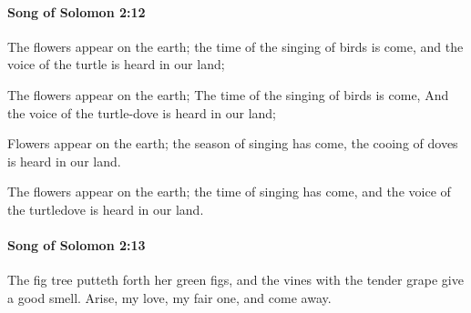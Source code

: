 		\paragraph{Song of Solomon 2:12} %
			\label{SONGOFSOLOMON-2-12}

			The flowers appear on the earth; the time of the singing of birds is come, and the voice of the turtle is heard in our land;

			\begin{versebox}
					\item[BHS] 
					\item[LXX] 
					\item[ASV] The flowers appear on the earth; The time of the singing of birds is come, And the voice of the turtle-dove is heard in our land;
					\item[NIV] Flowers appear on the earth; the season of singing has come, the cooing of doves is heard in our land.
					\item[NRSV] The flowers appear on the earth; the time of singing has come, and the voice of the turtledove is heard in our land.
			\end{versebox}

		\paragraph{Song of Solomon 2:13} %
			\label{SONGOFSOLOMON-2-13}

			The fig tree putteth forth her green figs, and the vines with the tender grape give a good smell. Arise, my love, my fair one, and come away.

